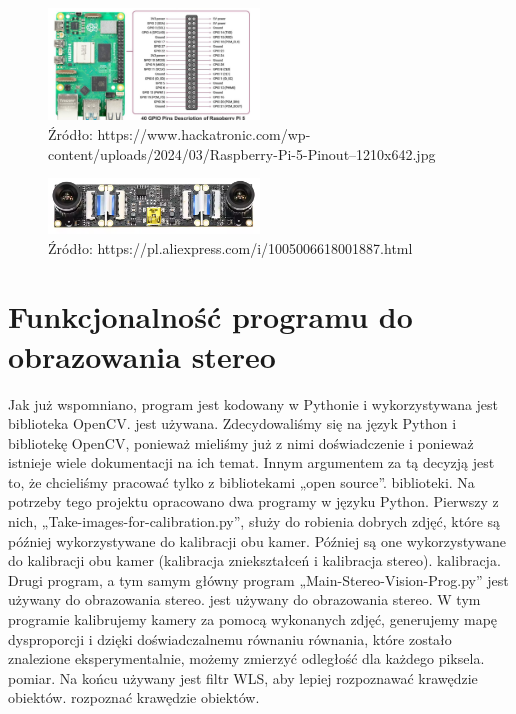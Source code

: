\documentclass[magisterska]{pracadypl}
\begin{document}
\begin{figure}[h]  %
    \centering  %
    \includegraphics[width=0.5\textwidth]{images/RPI-PIN.jpg}  %
    \captionsetup{labelformat=empty, font=footnotesize}
    \caption{Źródło: https://www.hackatronic.com/wp-content/uploads/2024/03/Raspberry-Pi-5-Pinout--1210x642.jpg}
    \label{fig:rpi-gpio}  %
\end{figure}

\begin{figure}[h]  %
    \centering  %
    \includegraphics[width=0.5\textwidth]{images/MAINSTEREO.png}  %
    \captionsetup{labelformat=empty, font=footnotesize}
    \caption{Źródło: https://pl.aliexpress.com/i/1005006618001887.html}
    \label{fig:mono}  %
\end{figure}

\section{Funkcjonalność programu do obrazowania stereo}

Jak już wspomniano, program jest kodowany w Pythonie i wykorzystywana jest biblioteka OpenCV.
jest używana. Zdecydowaliśmy się na język Python i bibliotekę OpenCV, ponieważ
mieliśmy już z nimi doświadczenie i ponieważ istnieje wiele dokumentacji na ich temat. Innym
argumentem za tą decyzją jest to, że chcieliśmy pracować tylko z bibliotekami „open source”.
biblioteki.
Na potrzeby tego projektu opracowano dwa programy w języku Python.
Pierwszy z nich, „Take-images-for-calibration.py”, służy do robienia dobrych zdjęć, które są później wykorzystywane do kalibracji obu kamer.
Później są one wykorzystywane do kalibracji obu kamer (kalibracja zniekształceń i kalibracja stereo).
kalibracja.
Drugi program, a tym samym główny program „Main-Stereo-Vision-Prog.py” jest używany do obrazowania stereo.
jest używany do obrazowania stereo. W tym programie kalibrujemy kamery za pomocą wykonanych zdjęć, generujemy mapę dysproporcji i dzięki doświadczalnemu równaniu
równania, które zostało znalezione eksperymentalnie, możemy zmierzyć odległość dla każdego piksela.
pomiar. Na końcu używany jest filtr WLS, aby lepiej rozpoznawać krawędzie obiektów.
rozpoznać krawędzie obiektów.
\end{document}
